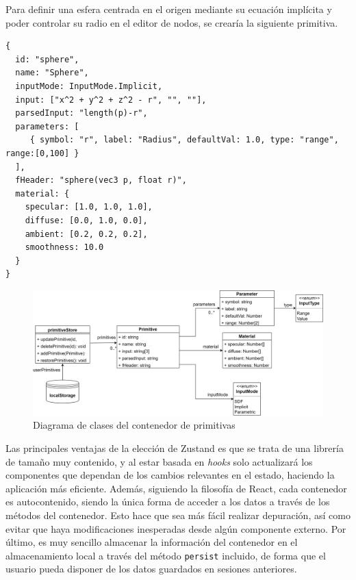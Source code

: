 \begin{ejemplo}
Para definir una esfera centrada en el origen mediante su ecuación implícita y poder controlar su radio en el editor de nodos, se crearía la siguiente primitiva.
\begin{lstlisting}
{
  id: "sphere",
  name: "Sphere",
  inputMode: InputMode.Implicit,
  input: ["x^2 + y^2 + z^2 - r", "", ""],
  parsedInput: "length(p)-r",
  parameters: [
     { symbol: "r", label: "Radius", defaultVal: 1.0, type: "range", range:[0,100] }
  ],
  fHeader: "sphere(vec3 p, float r)",
  material: {
    specular: [1.0, 1.0, 1.0],
    diffuse: [0.0, 1.0, 0.0],
    ambient: [0.2, 0.2, 0.2],
    smoothness: 10.0
  }
}
\end{lstlisting}
\end{ejemplo}

\begin{figure}[ht!]
    \centering
    \includegraphics[width=\textwidth]{Plantilla-TFG-master/img/diagramaZustand.png}
    \caption{Diagrama de clases del contenedor de primitivas}
    \label{fig:contenedorPrim}
\end{figure}

Las principales ventajas de la elección de Zustand es que se trata de una librería de tamaño muy contenido, y al estar basada en \textit{hooks} solo actualizará los componentes que dependan de los cambios relevantes en el estado, haciendo la aplicación más eficiente. Además, siguiendo la filosofía de React, cada contenedor es autocontenido, siendo la única forma de acceder a los datos a través de los métodos del contenedor. Esto hace que sea más fácil realizar depuración, así como evitar que haya modificaciones inesperadas desde algún componente externo. Por último, es muy sencillo almacenar la información del contenedor en el almacenamiento local a través del método \texttt{persist} incluido, de forma que el usuario pueda disponer de los datos guardados en sesiones anteriores.

